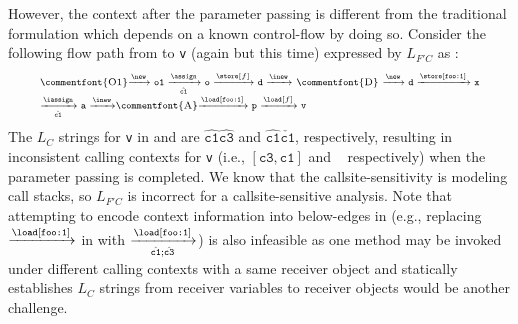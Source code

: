 However, the context after the parameter passing is different from the traditional
formulation \cite{sridharan2005demand, sridharan2006refinement} which depends on 
a known control-flow by doing so. Consider the following flow path from 
 to \texttt{v} (again but this time) expressed by $L_{F'C}$ as :
\begin{equation} \scriptsize
  \centering
\label{eq:alterLFPath}
\begin{tabular}{l} 
\commentfont{O1}$\xrightarrow{\new}
\texttt{o1}\xrightarrow[\hat{\mathtt{c1}}]{\assign}
\texttt{o} \xrightarrow{\store[f]} \texttt{d}
\xrightarrow{\inew}$ 
\commentfont{D} 
$ \xrightarrow{\new} \texttt{d}\xrightarrow{\store[\texttt{foo:1}]}\texttt{x}$\\
\scriptsize
$\xrightarrow[\check{\mathtt{c1}}]{\iassign}\texttt{a}
\xrightarrow{\inew}$\commentfont{A}$\xrightarrow{\load[\texttt{foo:1}]}\texttt{p}
    \xrightarrow{\load[f]} \texttt{v}
$
\end{tabular}
\end{equation}
The $L_C$ strings for \texttt{v} in  and 
 are $\hat{\mathtt{c1}}\hat{\mathtt{c3}}$ and
$\hat{\mathtt{c1}}\check{\mathtt{c1}}$, respectively, resulting in 
inconsistent calling contexts for \texttt{v} (i.e., $[\mathtt{c3}, \mathtt{c1}]$ and \emptyctx ~ respectively) when the parameter passing is completed.
We know that the callsite-sensitivity is modeling call stacks, so $L_{F'C}$ is incorrect
for a callsite-sensitive analysis. Note that attempting to encode context information 
into below-edges in \pag (e.g., replacing $\xrightarrow{\load[\texttt{foo:1}]}$ in
 with $\xrightarrow[\hat{\texttt{c1}};\hat{\texttt{c3}}]{\load[\texttt{foo:1}]}$) 
is also infeasible as one method may be invoked under different calling contexts with a same receiver object and statically establishes $L_C$ strings from receiver variables to receiver objects would be another challenge. 


